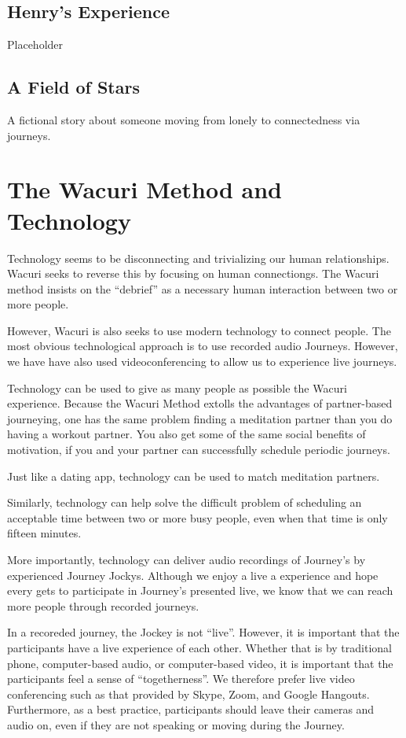 \documentclass[12pt]{book}
\begin{document}
\section{Henry's Experience}

Placeholder 

\section{A Field of Stars}

A fictional story about someone moving from lonely to connectedness via journeys.
\chapter{The Wacuri Method and Technology}

Technology seems to be disconnecting and trivializing our human relationships.
Wacuri seeks to reverse this by focusing on human connectiongs. The Wacuri method
insists on the ``debrief'' as a necessary human interaction between two or more people.

However, Wacuri is also seeks to use modern technology to connect people.
The most obvious technological approach is to use recorded audio Journeys.
However, we have have also used videoconferencing to allow us to experience live journeys.

Technology can be used to give as many people as possible the Wacuri experience.
Because the Wacuri Method extolls the advantages of partner-based journeying,
one has the same problem finding a meditation partner than you do having a
workout partner. You also get some of the same social benefits of motivation,
if you and your partner can successfully schedule periodic journeys.

Just like a dating app, technology can be used to match meditation partners.

Similarly, technology can help solve the difficult problem of scheduling an
acceptable time between two or more busy people, even when that time is only fifteen minutes.

More importantly, technology can deliver audio recordings of Journey's by
experienced Journey Jockys. Although we enjoy a live a experience and hope
every gets to participate in Journey's presented live, we know that we
can reach more people through recorded journeys.

In a recoreded journey, the Jockey is not ``live''. However, it is
important that the participants have a live experience of each other.
Whether that is by traditional phone, computer-based audio, or computer-based
video, it is important that the participants feel a sense of ``togetherness''.
We therefore prefer live video conferencing such as that provided by Skype,
Zoom, and Google Hangouts. Furthermore, as a best practice, participants
should leave their cameras and audio on, even if they are not speaking or
moving during the Journey.
\end{document}
